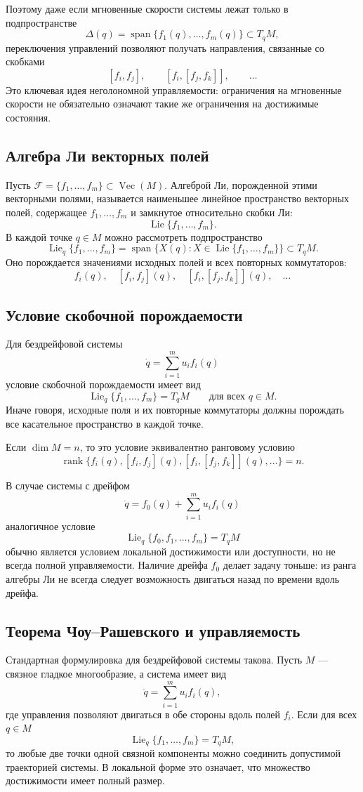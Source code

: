 \documentclass[12pt,a4paper]{article}
\newcommand{\Lie}{\operatorname{Lie}}
\newcommand{\Vect}{\operatorname{Vec}}
\newcommand{\rank}{\operatorname{rank}}
\begin{document}
Поэтому даже если мгновенные скорости системы лежат только в подпространстве
\[
\Delta(q)=\operatorname{span}\{f_1(q),\ldots,f_m(q)\}\subset T_qM,
\]
переключения управлений позволяют получать направления, связанные со скобками
\[
[f_i,f_j],\qquad [f_i,[f_j,f_k]],\qquad \ldots
\]
Это ключевая идея неголономной управляемости: ограничения на мгновенные скорости не обязательно означают такие же ограничения на достижимые состояния.

\subsection*{Алгебра Ли векторных полей}
Пусть $\mathcal F=\{f_1,\ldots,f_m\}\subset\Vect(M)$. Алгеброй Ли, порожденной этими векторными полями, называется наименьшее линейное пространство векторных полей, содержащее $f_1,\ldots,f_m$ и замкнутое относительно скобки Ли:
\[
\Lie\{f_1,\ldots,f_m\}.
\]
В каждой точке $q\in M$ можно рассмотреть подпространство
\[
\Lie_q\{f_1,\ldots,f_m\}
=
\operatorname{span}\{X(q):X\in\Lie\{f_1,\ldots,f_m\}\}\subset T_qM.
\]
Оно порождается значениями исходных полей и всех повторных коммутаторов:
\[
f_i(q),\quad [f_i,f_j](q),\quad [f_i,[f_j,f_k]](q),\quad \ldots
\]

\subsection*{Условие скобочной порождаемости}
Для бездрейфовой системы
\[
\dot q=\sum_{i=1}^m u_i f_i(q)
\]
условие скобочной порождаемости имеет вид
\[
\Lie_q\{f_1,\ldots,f_m\}=T_qM
\qquad \text{для всех }q\in M.
\]
Иначе говоря, исходные поля и их повторные коммутаторы должны порождать все касательное пространство в каждой точке.

Если $\dim M=n$, то это условие эквивалентно ранговому условию
\[
\rank\{f_i(q),[f_i,f_j](q),[f_i,[f_j,f_k]](q),\ldots\}=n.
\]

В случае системы с дрейфом
\[
\dot q=f_0(q)+\sum_{i=1}^m u_i f_i(q)
\]
аналогичное условие
\[
\Lie_q\{f_0,f_1,\ldots,f_m\}=T_qM
\]
обычно является условием локальной достижимости или доступности, но не всегда полной управляемости. Наличие дрейфа $f_0$ делает задачу тоньше: из ранга алгебры Ли не всегда следует возможность двигаться назад по времени вдоль дрейфа.

\subsection*{Теорема Чоу--Рашевского и управляемость}
Стандартная формулировка для бездрейфовой системы такова. Пусть $M$ --- связное гладкое многообразие, а система имеет вид
\[
\dot q=\sum_{i=1}^m u_i f_i(q),
\]
где управления позволяют двигаться в обе стороны вдоль полей $f_i$. Если для всех $q\in M$
\[
\Lie_q\{f_1,\ldots,f_m\}=T_qM,
\]
то любые две точки одной связной компоненты можно соединить допустимой траекторией системы. В локальной форме это означает, что множество достижимости имеет полный размер.
\end{document}
